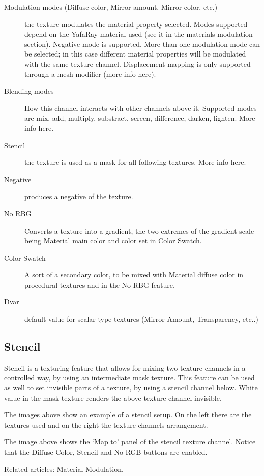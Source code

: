 \begin{description}
\item[Modulation modes (Diffuse color, Mirror amount, Mirror color, etc.)] the texture modulates the material property selected. Modes supported depend on the YafaRay material used (see it in the materials modulation section). Negative mode is supported. More than one modulation mode can be selected; in this case different material properties will be modulated with the same texture channel. Displacement mapping is only supported through a mesh modifier (more info here).
\item[Blending modes] How this channel interacts with other channels above it. Supported modes are mix, add, multiply, substract, screen, difference, darken, lighten. More info here.
\item[Stencil] the texture is used as a mask for all following textures. More info here.
\item[Negative] produces a negative of the texture.
\item[No RBG] Converts a texture into a gradient, the two extremes of the gradient scale being Material main color and color set in Color Swatch.
\item[Color Swatch] A sort of a secondary color, to be mixed with Material diffuse color in procedural textures and in the No RBG feature.
\item[Dvar] default value for scalar type textures (Mirror Amount, Transparency, etc..)
\end{description}

\subsection{Stencil}

Stencil is a texturing feature that allows for mixing two texture channels in a controlled way, by using an intermediate mask texture. This feature can be used as well to set invisible parts of a texture, by using a stencil channel below. White value in the mask texture renders the above texture channel invisible.

The images above show an example of a stencil setup. On the left there are the textures used and on the right the texture channels arrangement.

The image above shows the `Map to' panel of the stencil texture channel. Notice that the Diffuse Color, Stencil and No RGB buttons are enabled.

Related articles: Material Modulation.

